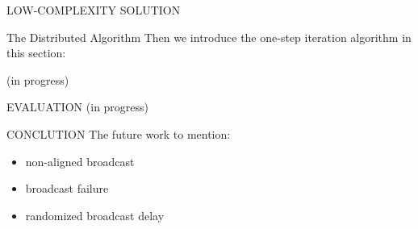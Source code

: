 \documentclass[10pt, conference, letterpaper]{IEEEtran}
\begin{document}
\begin{section}{LOW-COMPLEXITY SOLUTION}
        \begin{subsection}{The Distributed Algorithm}
            Then we introduce the one-step iteration algorithm in this section:
            \begin{algorithm}[H]
                \caption{Distributed Algorithm for $k$-th AP}
                \begin{algorithmic}
                    \WHILE{\TRUE}
                        \STATE (in progress)
                    \ENDWHILE
                \end{algorithmic}
            \end{algorithm}
        \end{subsection}
        
    \end{section}

    \begin{section}{EVALUATION}
        \label{sec:evaluation}
        (in progress)
    \end{section}

    \begin{section}{CONCLUTION}
        \label{sec:conclusion}
        The future work to mention:
        \begin{itemize}
            \item non-aligned broadcast
            \item broadcast failure
            \item randomized broadcast delay
        \end{itemize}
    \end{section}

    
    
\end{document}
